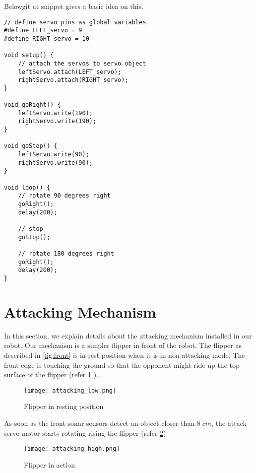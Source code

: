 \documentclass[11pt, letterpaper, oneside]{article}
\begin{document}
Belowgit at snippet gives a basic idea on this.
\begin{verbatim}
// define servo pins as global variables
#define LEFT_servo = 9 
#define RIGHT_servo = 10

void setup() {
    // attach the servos to servo object
    leftServo.attach(LEFT_servo); 
    rightServo.attach(RIGHT_servo); 
}

void goRight() {
    leftServo.write(190);
    rightServo.write(190);
}

void goStop() {
    leftServo.write(90);
    rightServo.write(90);
}

void loop() {
    // rotate 90 degrees right
    goRight();
    delay(200);
    
    // stop
    goStop();
    
    // rotate 180 degrees right
    goRight();
    delay(200);
}
\end{verbatim}



\newpage
\section{Attacking Mechanism} \label{sec:attacking}
In this section, we explain details about the attacking mechanism installed in our robot. Our mechanism is a simpler flipper in front of the robot. The flipper as described in \cref{fig:front} is in rest position when it is in non-attacking mode. The front edge is touching the ground so that the opponent might ride up the top surface of the flipper (refer \cref{fig:attacking_low} ). 

\begin{figure}[bth]
	\begin{center}
		\texttt{[image: attacking\_low.png]}
		\caption{ Flipper in resting position}
		\label{fig:attacking_low}
	\end{center}
\end{figure}


As soon as the front sonar sensors detect an object closer than $8\;cm$, the attack servo motor starts rotating rising the flipper (refer \cref{fig:attacking_high}).

\begin{figure}[bth]
	\begin{center}
		\texttt{[image: attacking\_high.png]}
		\caption{ Flipper in action}
		\label{fig:attacking_high}
	\end{center}
\end{figure}
\end{document}
